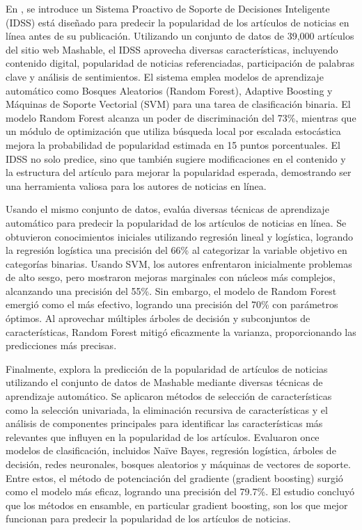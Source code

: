 \documentclass[
  number,
  preprint,
  3p,
  twocolumn]{elsarticle}
\begin{document}
En \citep{fernandes2015}, se introduce un Sistema Proactivo de Soporte
de Decisiones Inteligente (IDSS) está diseñado para predecir la
popularidad de los artículos de noticias en línea antes de su
publicación. Utilizando un conjunto de datos de 39,000 artículos del
sitio web Mashable, el IDSS aprovecha diversas características,
incluyendo contenido digital, popularidad de noticias referenciadas,
participación de palabras clave y análisis de sentimientos. El sistema
emplea modelos de aprendizaje automático como Bosques Aleatorios (Random
Forest), Adaptive Boosting y Máquinas de Soporte Vectorial (SVM) para
una tarea de clasificación binaria. El modelo Random Forest alcanza un
poder de discriminación del 73\%, mientras que un módulo de optimización
que utiliza búsqueda local por escalada estocástica mejora la
probabilidad de popularidad estimada en 15 puntos porcentuales. El IDSS
no solo predice, sino que también sugiere modificaciones en el contenido
y la estructura del artículo para mejorar la popularidad esperada,
demostrando ser una herramienta valiosa para los autores de noticias en
línea.

Usando el mismo conjunto de datos, \citep{Ren2015PredictingAE} evalúa
diversas técnicas de aprendizaje automático para predecir la popularidad
de los artículos de noticias en línea. Se obtuvieron conocimientos
iniciales utilizando regresión lineal y logística, logrando la regresión
logística una precisión del 66\% al categorizar la variable objetivo en
categorías binarias. Usando SVM, los autores enfrentaron inicialmente
problemas de alto sesgo, pero mostraron mejoras marginales con núcleos
más complejos, alcanzando una precisión del 55\%. Sin embargo, el modelo
de Random Forest emergió como el más efectivo, logrando una precisión
del 70\% con parámetros óptimos. Al aprovechar múltiples árboles de
decisión y subconjuntos de características, Random Forest mitigó
eficazmente la varianza, proporcionando las predicciones más precisas.

Finalmente, \citep{khan2018} explora la predicción de la popularidad de
artículos de noticias utilizando el conjunto de datos de Mashable
mediante diversas técnicas de aprendizaje automático. Se aplicaron
métodos de selección de características como la selección univariada, la
eliminación recursiva de características y el análisis de componentes
principales para identificar las características más relevantes que
influyen en la popularidad de los artículos. Evaluaron once modelos de
clasificación, incluidos Naïve Bayes, regresión logística, árboles de
decisión, redes neuronales, bosques aleatorios y máquinas de vectores de
soporte. Entre estos, el método de potenciación del gradiente (gradient
boosting) surgió como el modelo más eficaz, logrando una precisión del
79.7\%. El estudio concluyó que los métodos en ensamble, en particular
gradient boosting, son los que mejor funcionan para predecir la
popularidad de los artículos de noticias.
\end{document}
